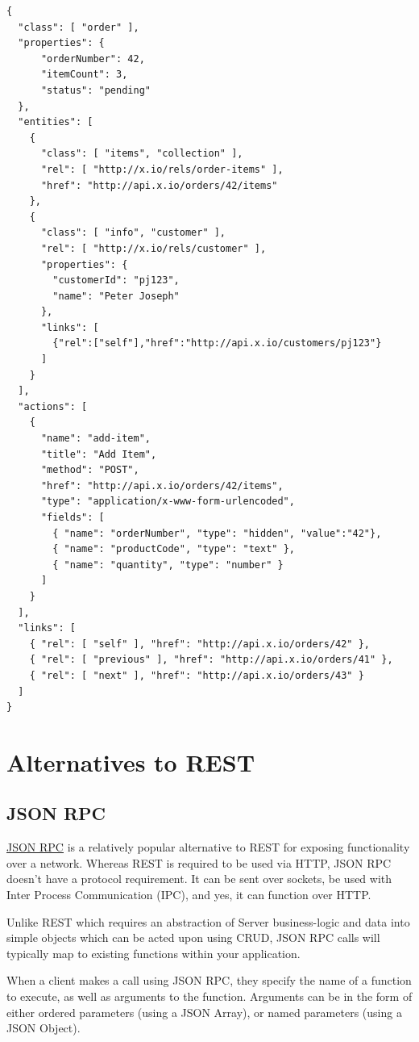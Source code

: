 \documentclass{book}
\begin{document}
\begin{verbatim}
{
  "class": [ "order" ],
  "properties": { 
      "orderNumber": 42, 
      "itemCount": 3,
      "status": "pending"
  },
  "entities": [
    { 
      "class": [ "items", "collection" ], 
      "rel": [ "http://x.io/rels/order-items" ], 
      "href": "http://api.x.io/orders/42/items"
    },
    {
      "class": [ "info", "customer" ],
      "rel": [ "http://x.io/rels/customer" ], 
      "properties": { 
        "customerId": "pj123",
        "name": "Peter Joseph"
      },
      "links": [
        {"rel":["self"],"href":"http://api.x.io/customers/pj123"}
      ]
    }
  ],
  "actions": [
    {
      "name": "add-item",
      "title": "Add Item",
      "method": "POST",
      "href": "http://api.x.io/orders/42/items",
      "type": "application/x-www-form-urlencoded",
      "fields": [
        { "name": "orderNumber", "type": "hidden", "value":"42"},
        { "name": "productCode", "type": "text" },
        { "name": "quantity", "type": "number" }
      ]
    }
  ],
  "links": [
    { "rel": [ "self" ], "href": "http://api.x.io/orders/42" },
    { "rel": [ "previous" ], "href": "http://api.x.io/orders/41" },
    { "rel": [ "next" ], "href": "http://api.x.io/orders/43" }
  ]
}
\end{verbatim}


\section{Alternatives to REST}

\subsection{JSON RPC}

\href{http://www.jsonrpc.org/specification}{JSON RPC} \cite{JSONRPC} is a relatively popular alternative to REST for exposing functionality over a network. Whereas REST is required to be used via HTTP, JSON RPC doesn't have a protocol requirement. It can be sent over sockets, be used with Inter Process Communication (IPC), and yes, it can function over HTTP.

Unlike REST which requires an abstraction of Server business-logic and data into simple objects which can be acted upon using CRUD, JSON RPC calls will typically map to existing functions within your application.

When a client makes a call using JSON RPC, they specify the name of a function to execute, as well as arguments to the function. Arguments can be in the form of either ordered parameters (using a JSON Array), or named parameters (using a JSON Object).
\end{document}
